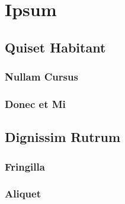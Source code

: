 \chapter{Ipsum}

\lipsum[1-3]

\section{Quiset Habitant}

\lipsum[4-10]

\subsection{Nullam Cursus}

\lipsum[11-13]

\subsection{Donec et Mi}

\lipsum[14-17]

\section{Dignissim Rutrum}

\lipsum[20-26]

\subsection{Fringilla}

\lipsum[26-28]

\subsection{Aliquet}

\lipsum[29-30]

